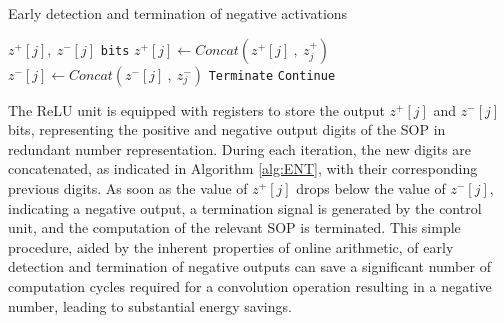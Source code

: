 \documentclass[conference]{IEEEtran}
\DeclarePairedDelimiter{\ceil}{\lceil}{\rceil}
\begin{document}
\begin{algorithm}[!ht]
\caption{Early detection and termination of negative activations}\label{alg:ENT}
\begin{algorithmic}[1]
\State $z^{+}[j],\ z^{-}[j] $ \texttt{bits}\;
    \State $z^{+}[j] \gets Concat(z^{+}[j] \ , \ z^{+}_{j})$\;
    \State $z^{-}[j] \gets  Concat(z^{-}[j] \ , \ z^{-}_{j})$\;
        \State \texttt{Terminate}
    \Else
        \State \texttt{Continue}
    \EndIf
\EndFor
\end{algorithmic}
\end{algorithm}


The ReLU unit is equipped with registers to store the output \(z^{+}[j]\) and \(z^{-}[j]\) bits, representing the positive and negative output digits of the SOP in redundant number representation. During each iteration, the new digits are concatenated, as indicated in Algorithm \ref{alg:ENT}, with their corresponding previous digits. As soon as the value of \(z^{+}[j]\) drops below the value of \(z^{-}[j]\), indicating a negative output, a termination signal is generated by the control unit, and the computation of the relevant SOP is terminated. This simple procedure, aided by the inherent properties of online arithmetic, of early detection and termination of negative outputs can save a significant number of computation cycles required for a convolution operation resulting in a negative number, leading to substantial energy savings.
\end{document}
